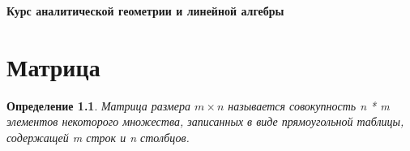 \documentclass[12pt,a4paper]{report}
\newtheorem{definition}{Определение}
\begin{document}
\begin{titlepage}
    \begin{center}
        \textbf{Курс аналитической геометрии и линейной алгебры}
    \end{center}
\end{titlepage}


\chapter{Матрица}

\begin{definition}
    Матрица размера $m \times n$ называется совокупность n * m элементов некоторого множества, записанных в виде прямоугольной таблицы, содержащей m строк и n столбцов.
\end{definition}
\end{document}
